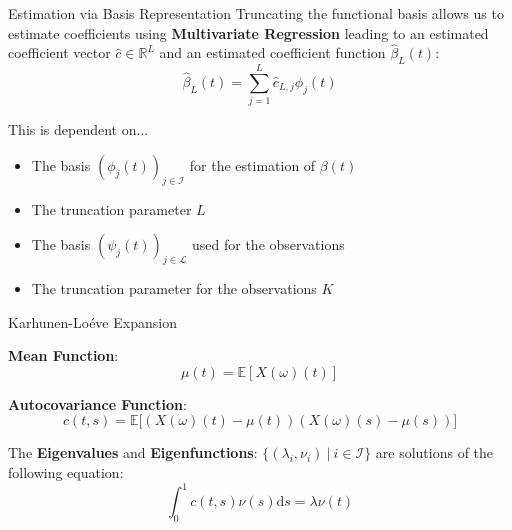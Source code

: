 \documentclass{beamer}
\begin{document}
	\begin{frame}{Estimation via Basis Representation}
		Truncating the functional basis allows us to estimate coefficients using \textbf{Multivariate Regression} leading to an estimated coefficient vector $\hat{c} \in \mathbb{R}^L$ and an estimated coefficient function $\hat{\beta}_L(t)$:
		\vspace{-0.2cm}
		$$\hat{\beta}_L(t) = \sum_{j = 1}^{L} \hat{c}_{L,j} \phi_j(t)$$
		
		This is dependent on...\vspace{-0.2cm}
		\begin{multicols}{2}
			\begin{itemize}
				\item The basis $(\phi_j(t))_{j \in \mathcal{I}}$ for the estimation of $\beta(t)$
				\item The truncation parameter $L$\vfill\null
				\item The basis $(\psi_j(t))_{j \in \mathcal{L}}$ used for the observations
				\item The truncation parameter for the observations $K$
			\end{itemize}
		\end{multicols}

	\end{frame}

	\begin{frame}{Karhunen-Lo\'{e}ve Expansion}
		
		\textbf{Mean Function}: $$\mu(t) = \mathbb{E}\left[ X(\omega)(t) \right]$$

		\textbf{Autocovariance Function}: $$c(t,s) = \mathbb{E}\big[ \left( X(\omega)(t) - \mu(t) \right) \left( X(\omega)(s) - \mu(s) \right) \big]$$
		
		The \textbf{Eigenvalues} and \textbf{Eigenfunctions}: $\{(\lambda_i, \nu_i) \: \vert \: i \in \mathcal{I}\}$  are solutions of the following equation:
		$$ \int_{0}^{1}c(t,s)\nu(s) \mathrm{d}s = \lambda \nu(t) $$
	\end{frame}
	
\end{document}
